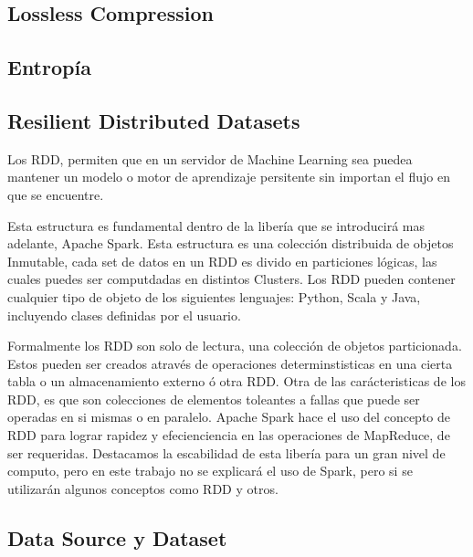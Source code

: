 
\subsection{Lossless Compression}



\subsection{Entropía}






\subsection{ Resilient Distributed Datasets }

	Los RDD, permiten que en un servidor de Machine Learning sea puedea mantener un modelo o motor de aprendizaje persitente sin importan el flujo en que se encuentre.

	Esta estructura es fundamental dentro de la libería que se introducirá mas adelante, Apache Spark. Esta estructura es una colección distribuida de objetos Inmutable, cada 
	set de datos en un RDD es divido en particiones lógicas, las cuales puedes ser computdadas en distintos Clusters. Los RDD pueden contener cualquier tipo de objeto de los siguientes lenguajes: Python, Scala y Java, incluyendo clases definidas por el usuario. 

	Formalmente los RDD son solo de lectura, una colección de objetos particionada. Estos pueden ser creados através de  operaciones determinstisticas en una cierta tabla o un almacenamiento externo ó otra RDD.
	Otra de las carácteristicas de los RDD, es que son colecciones de elementos toleantes a fallas que puede ser operadas en si mismas o en paralelo.
	Apache Spark hace el uso del concepto de RDD para lograr rapidez y efecienciencia en las operaciones de MapReduce, de ser requeridas. Destacamos la escabilidad de esta libería para un gran nivel de computo, pero en este trabajo no se explicará el uso de Spark, pero si se utilizarán algunos conceptos como RDD y otros.




\subsection{Data Source y Dataset }

